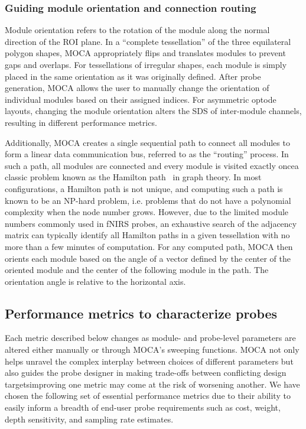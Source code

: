 \subsubsection{Guiding module orientation and connection routing}
Module orientation refers to the rotation of the module along the normal direction of the ROI plane. In a ``complete tessellation'' of the three equilateral polygon shapes, MOCA appropriately flips and translates modules to prevent gaps and overlaps. For tessellations of irregular shapes, each module is simply placed in the same orientation as it was originally defined. After probe generation, MOCA allows the user to manually change the orientation of individual modules based on their assigned indices. For asymmetric optode layouts, changing the module orientation alters the SDS of inter-module channels, resulting in different performance metrics.

Additionally, MOCA creates a single sequential path to connect all modules to form a linear data communication bus, referred to as the ``routing'' process. In such a path, all modules are connected and every module is visited exactly once\textemdash a classic problem known as the Hamilton path~\cite{Kamae1967} in graph theory. In most configurations, a Hamilton path is not unique, and computing such a path is known to be an NP-hard problem, i.e. problems that do not have a polynomial complexity when the node number grows. However, due to the limited module numbers commonly used in \ac{fNIRS} probes, an exhaustive search of the adjacency matrix can typically identify all Hamilton paths in a given tessellation with no more than a few minutes of computation. For any computed path, MOCA then orients each module based on the angle of a vector defined by the center of the oriented module and the center of the following module in the path. The orientation angle is relative to the horizontal axis.

\subsection{Performance metrics to characterize probes}
Each metric described below changes as module- and probe-level parameters are altered either manually or through MOCA's sweeping functions. MOCA not only helps unravel the complex interplay between choices of different parameters but also guides the probe designer in making trade-offs between conflicting design targets\textemdash improving one metric may come at the risk of worsening another. We have chosen the following set of essential performance metrics due to their ability to easily inform a breadth of end-user probe requirements such as cost, weight, depth sensitivity, and sampling rate estimates.

